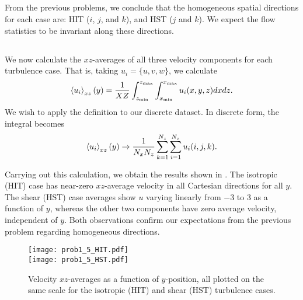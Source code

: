 \documentclass[11pt]{article}
\begin{document}
\subsection{}

From the previous problems, we conclude that the homogeneous spatial directions for each case are: HIT ($i$, $j$, and $k$), and HST ($j$ and $k$). We expect the flow statistics to be invariant along these directions.

\subsection{}

We now calculate the $xz$-averages of all three velocity components for each turbulence case. That is, taking $u_i = \{ u, v, w \}$, we calculate
\begin{equation}
\left< u_i \right>_{xz}(y)
=
\frac{1}{XZ}
\int_{z_\text{min}}^{z_\text{max}}
\int_{x_\text{min}}^{x_\text{max}}
u_i(x,y,z) dx dz
.
\end{equation}
We wish to apply the definition to our discrete dataset. In discrete form, the integral becomes
\begin{equation}
\left< u_i \right>_{xz}(y)
\rightarrow
\frac{1}{N_x N_z}
\sum_{k=1}^{N_z}
\sum_{i=1}^{N_x}
u_i(i,j,k)
.
\end{equation}

Carrying out this calculation, we obtain the results shown in . The isotropic (HIT) case has near-zero $xz$-average velocity in all Cartesian directions for all $y$. The shear (HST) case averages show $u$ varying linearly from $-3$ to $3$ as a function of $y$, whereas the other two components have zero average velocity, independent of $y$. Both observations confirm our expectations from the previous problem regarding homogeneous directions.

\begin{figure}[t]
\centering
\texttt{[image: prob1\_5\_HIT.pdf]}
\\
\texttt{[image: prob1\_5\_HST.pdf]}
\\[6pt]
\caption{Velocity $xz$-averages as a function of $y$-position, all plotted on the same scale for the isotropic (HIT) and shear (HST) turbulence cases.}
\label{fig:prob_1_5_xzaverages}
\end{figure}

\subsection{}
\end{document}
